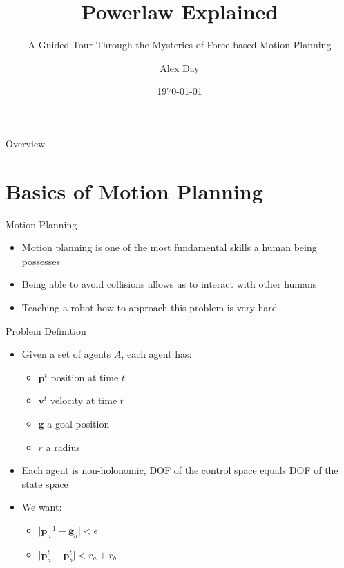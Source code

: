 \documentclass[aspectratio=169,xcolor=dvipsnames]{beamer}
\title[short title]{Powerlaw Explained} %
\subtitle{A Guided Tour Through the Mysteries of Force-based Motion Planning}
\author[Day]{Alex Day}
\institute[CU] %
{
  Ph.D. Student\\
  Motion Planning Lab @ Clemson University\\
  \vspace{5px}
}
\date{\today} %
\begin{document}
\begin{frame}
    \titlepage
\end{frame}

\begin{frame}{Overview}
    \tableofcontents
\end{frame}

\section{Basics of Motion Planning}

\begin{frame}{Motion Planning}
    \begin{itemize}
        \item Motion planning is one of the most fundamental skills a human being possesses
        \item Being able to avoid collisions allows us to interact with other humans
        \item Teaching a robot how to approach this problem is very hard
    \end{itemize}
\end{frame}

\begin{frame}{Problem Definition}
    \begin{itemize}
        \item Given a set of agents $A$, each agent has:
        \begin{itemize}
          \item $\mathbf{p}^{t}$ position at time $t$
          \item $\mathbf{v}^{t}$ velocity at time $t$
          \item $\mathbf{g}$ a goal position
          \item $r$ a radius
        \end{itemize}
        \item Each agent is non-holonomic, DOF of the control space equals DOF of the state space
        \item We want:
        \begin{itemize}
          \item $\lvert \mathbf{p}^{-1}_{a} - \mathbf{g}_{a} \rvert < \epsilon$
          \item $\lvert \mathbf{p}^{t}_{a} - \mathbf{p}^{t}_{b} \rvert < r_{a} + r_{b}$
        \end{itemize}
    \end{itemize}
\end{frame}
\end{document}
